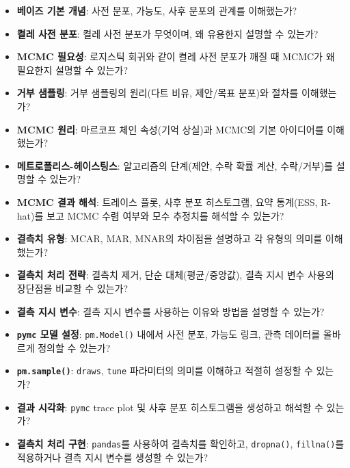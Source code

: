 \documentclass[11pt,a4paper]{book}
\theoremstyle{definition}
\begin{document}
\begin{infobox}[title=학습 점검 체크리스트]
\begin{itemize}
    \item \textbf{베이즈 기본 개념}: 사전 분포, 가능도, 사후 분포의 관계를 이해했는가?
    \item \textbf{켤레 사전 분포}: 켤레 사전 분포가 무엇이며, 왜 유용한지 설명할 수 있는가?
    \item \textbf{MCMC 필요성}: 로지스틱 회귀와 같이 켤레 사전 분포가 깨질 때 MCMC가 왜 필요한지 설명할 수 있는가?
    \item \textbf{거부 샘플링}: 거부 샘플링의 원리(다트 비유, 제안/목표 분포)와 절차를 이해했는가?
    \item \textbf{MCMC 원리}: 마르코프 체인 속성(기억 상실)과 MCMC의 기본 아이디어를 이해했는가?
    \item \textbf{메트로폴리스-헤이스팅스}: 알고리즘의 단계(제안, 수락 확률 계산, 수락/거부)를 설명할 수 있는가?
    \item \textbf{MCMC 결과 해석}: 트레이스 플롯, 사후 분포 히스토그램, 요약 통계(ESS, R-hat)를 보고 MCMC 수렴 여부와 모수 추정치를 해석할 수 있는가?
    \item \textbf{결측치 유형}: MCAR, MAR, MNAR의 차이점을 설명하고 각 유형의 의미를 이해했는가?
    \item \textbf{결측치 처리 전략}: 결측치 제거, 단순 대체(평균/중앙값), 결측 지시 변수 사용의 장단점을 비교할 수 있는가?
    \item \textbf{결측 지시 변수}: 결측 지시 변수를 사용하는 이유와 방법을 설명할 수 있는가?
\end{itemize}
\end{infobox}

\begin{infobox}[title=코드 활용 체크리스트]
\begin{itemize}
    \item \textbf{\texttt{pymc} 모델 설정}: \texttt{pm.Model()} 내에서 사전 분포, 가능도 링크, 관측 데이터를 올바르게 정의할 수 있는가?
    \item \textbf{\texttt{pm.sample()}}: \texttt{draws}, \texttt{tune} 파라미터의 의미를 이해하고 적절히 설정할 수 있는가?
    \item \textbf{결과 시각화}: \texttt{pymc} trace plot 및 사후 분포 히스토그램을 생성하고 해석할 수 있는가?
    \item \textbf{결측치 처리 구현}: \texttt{pandas}를 사용하여 결측치를 확인하고, \texttt{dropna()}, \texttt{fillna()}를 적용하거나 결측 지시 변수를 생성할 수 있는가?
\end{itemize}
\end{infobox}
\end{document}
